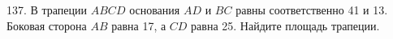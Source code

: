 137. В трапеции $ABCD$ основания $AD$ и $BC$ равны соответственно 41 и 13. Боковая сторона $AB$ равна 17, а $CD$ равна 25. Найдите площадь трапеции.\\
